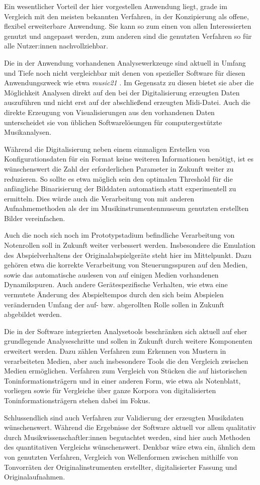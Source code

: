 Ein wesentlicher Vorteil der hier vorgestellen Anwendung liegt, grade im Vergleich mit den meisten bekannten Verfahren, in der Konzipierung als offene, flexibel erweiterbare Anwendung.
Sie kann so zum einen von allen Interessierten genutzt und angepasst werden, zum anderen sind die genutzten Verfahren so für alle Nutzer:innen nachvollziehbar.

Die in der Anwendung vorhandenen Analysewerkzeuge sind aktuell in Umfang und Tiefe noch nicht vergleichbar mit denen von spezieller Software für diesen Anwendungszweck wie etwa \textit{music21} \parencite[]{music21}.
Im Gegensatz zu diesen bietet sie aber die Möglichkeit Analysen direkt auf den bei der Digitalisierung erzeugten Daten auszuführen und nicht erst auf der abschließend erzeugten Midi-Datei.
Auch die direkte Erzeugung von Visualisierungen aus den vorhandenen Daten unterscheidet sie von üblichen Softwarelösungen für computergestützte Musikanalysen. %

Während die Digitalisierung neben einem einmaligen Erstellen von Konfigurationsdaten für ein Format keine weiteren Informationen benötigt, ist es wünschenswert die Zahl der erforderlichen Parameter in Zukunft weiter zu reduzieren.
So sollte es etwa möglich sein den optimalen Threshold für die anfängliche Binarisierung der Bilddaten automatisch statt experimentell zu ermitteln.
Dies würde auch die Verarbeitung von mit anderen Aufnahmemethoden als der im Musikinstrumentenmuseum genutzten erstellten Bilder vereinfachen.

Auch die noch sich noch im Prototypstadium befindliche Verarbeitung von Notenrollen soll in Zukunft weiter verbessert werden.
Insbesondere die Emulation des Abspielverhaltens der Originalabspielgeräte steht hier im Mittelpunkt.
Dazu gehören etwa die korrekte Verarbeitung von Steuerungsspuren auf den Medien, sowie das automatische auslesen von auf einigen Medien vorhandenen Dynamikspuren.
Auch andere Gerätespezifische Verhalten, wie etwa eine vermutete Änderung des Abspieltempos durch den sich beim Abspielen verändernden Umfang der auf- bzw. abgerollten Rolle sollen in Zukunft abgebildet werden.

Die in der Software integrierten Analysetools beschränken sich aktuell auf eher grundlegende Analyseschritte und sollen in Zukunft durch weitere Komponenten erweitert werden.
Dazu zählen Verfahren zum Erkennen von Mustern in verarbeiteten Medien, aber auch insbesondere Tools die den Vergleich zwischen Medien ermöglichen.
Verfahren zum Vergleich von Stücken die auf historischen Toninformationsträgern und in einer anderen Form, wie etwa als Notenblatt, vorliegen sowie für Vergleiche über ganze Korpora von digitalisierten Toninformationsträgern stehen dabei im Fokus. 

Schlussendlich sind auch Verfahren zur Validierung der erzeugten Musikdaten wünschenswert.
Während die Ergebnisse der Software aktuell vor allem qualitativ durch Musikwissenschaftler:innen begutachtet werden, sind hier auch Methoden des quantitativen Vergleichs wünschenswert.
Denkbar wäre etwa ein, ähnlich dem von \textcite[]{colmenares_2011} genutzten Verfahren, Vergleich von Wellenformen zwischen mithilfe von Tonvorräten der Originalinstrumenten erstellter, digitalisierter Fassung und Originalaufnahmen.